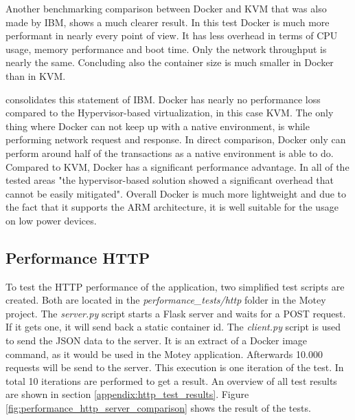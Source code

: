 Another benchmarking comparison\autocite{Russell:Performance:2014} between Docker and \ac{KVM} that was also made by IBM, shows a much clearer result.
In this test Docker is much more performant in nearly every point of view.
It has less overhead in terms of \ac{CPU} usage\autocite[cf.][p. 25]{Russell:Performance:2014}, memory performance\autocite[cf.][p. 50]{Russell:Performance:2014} and boot time\autocite[cf.][p. 24]{Russell:Performance:2014}.
Only the network throughput is nearly the same.\autocite[cf.][p. 52]{Russell:Performance:2014}
Concluding also the container size is much smaller in Docker than in \ac{KVM}.\autocite[cf.][p. 66]{Russell:Performance:2014}\newline

\autocite{Ramalho:2016} consolidates this statement of IBM.
Docker has nearly no performance loss compared to the Hypervisor-based virtualization, in this case \ac{KVM}.\autocite[cf.][p. 3 ff.]{Ramalho:2016}
The only thing where Docker can not keep up with a native environment, is while performing network request and response.
In direct comparison, Docker only can perform around half of the transactions as a native environment is able to do.\autocite[cf.][p. 6]{Ramalho:2016}
Compared to \ac{KVM}, Docker has a significant performance advantage.
In all of the tested areas "the hypervisor-based solution showed a significant overhead that cannot be easily mitigated"\autocite[p. 6]{Ramalho:2016}.
Overall Docker is much more lightweight and due to the fact that it supports the ARM architecture, it is well suitable for the usage on low power devices.

\subsection{Performance HTTP}
To test the \ac{HTTP} performance of the application, two simplified test scripts are created.
Both are located in the \textit{performance\_tests/http} folder in the Motey project.
The \textit{server.py} script starts a Flask server and waits for a POST request.
If it gets one, it will send back a static container id.
The \textit{client.py} script is used to send the \ac{JSON} data to the server.
It is an extract of a Docker image command, as it would be used in the Motey application.
Afterwards 10.000 requests will be send to the server.
This execution is one iteration of the test.
In total 10 iterations are performed to get a result.
An overview of all test results are shown in section \ref{appendix:http_test_results}.
Figure \ref{fig:performance_http_server_comparison} shows the result of the tests.

